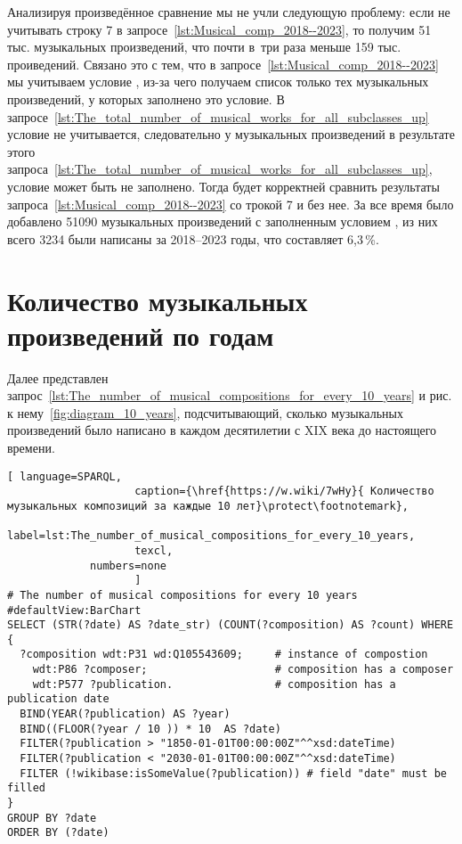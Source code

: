 Анализируя произведённое сравнение  мы не учли следующую проблему: если не учитывать строку 7 в запросе~\ref{lst:Musical_comp_2018--2023}, то получим \num{51} тыс. музыкальных произведений, что почти в~три раза меньше \num{159} тыс. проиведений. Связано это с тем, что в запросе~\ref{lst:Musical_comp_2018--2023} мы учитываем условие , из-за чего получаем список только тех музыкальных произведений, у которых заполнено это условие. В запросе~\ref{lst:The_total_number_of_musical_works_for_all_subclasses_up} условие   не учитывается, следовательно у музыкальных произведений в результате этого запроса~\ref{lst:The_total_number_of_musical_works_for_all_subclasses_up}, условие  может быть не заполнено. Тогда будет корректней сравнить результаты запроса~\ref{lst:Musical_comp_2018--2023} со трокой 7 и без нее. За все время было добавлено \num{51090} музыкальных произведений с заполненным условием , из них всего \num{3234} были написаны за 2018--2023 годы, что составляет 6,3\,\%.

\newpage
\section{Количество музыкальных произведений по годам}
Далее представлен запрос~\ref{lst:The_number_of_musical_compositions_for_every_10_years} и рис. к нему~\ref{fig:diagram_10_years}, подсчитывающий, сколько музыкальных произведений было написано в каждом десятилетии с XIX века до настоящего времени.

\begin{lstlisting}[ language=SPARQL,
                    caption={\href{https://w.wiki/7wHy}{ Количество музыкальных композиций за каждые 10 лет}\protect\footnotemark},
                    label=lst:The_number_of_musical_compositions_for_every_10_years,
                    texcl,
	         numbers=none
                    ]
# The number of musical compositions for every 10 years
#defaultView:BarChart
SELECT (STR(?date) AS ?date_str) (COUNT(?composition) AS ?count) WHERE {
  ?composition wdt:P31 wd:Q105543609;     # instance of compostion
    wdt:P86 ?composer;                    # composition has a composer
    wdt:P577 ?publication.                # composition has a publication date
  BIND(YEAR(?publication) AS ?year)
  BIND((FLOOR(?year / 10 )) * 10  AS ?date)
  FILTER(?publication > "1850-01-01T00:00:00Z"^^xsd:dateTime)
  FILTER(?publication < "2030-01-01T00:00:00Z"^^xsd:dateTime) 
  FILTER (!wikibase:isSomeValue(?publication)) # field "date" must be filled
}
GROUP BY ?date
ORDER BY (?date)
\end{lstlisting}%


